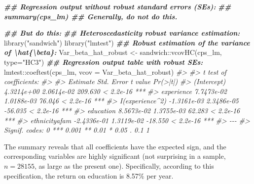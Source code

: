 \documentclass[
  14pt,
]{memoir}
\newenvironment{Shaded}{\begin{snugshade}}{\end{snugshade}}
\newcommand{\AttributeTok}[1]{\textcolor[rgb]{0.77,0.63,0.00}{#1}}
\newcommand{\CommentTok}[1]{\textcolor[rgb]{0.56,0.35,0.01}{\textit{#1}}}
\newcommand{\DocumentationTok}[1]{\textcolor[rgb]{0.56,0.35,0.01}{\textbf{\textit{#1}}}}
\newcommand{\FunctionTok}[1]{\textcolor[rgb]{0.00,0.00,0.00}{#1}}
\newcommand{\NormalTok}[1]{#1}
\newcommand{\OtherTok}[1]{\textcolor[rgb]{0.56,0.35,0.01}{#1}}
\newcommand{\SpecialCharTok}[1]{\textcolor[rgb]{0.00,0.00,0.00}{#1}}
\newcommand{\StringTok}[1]{\textcolor[rgb]{0.31,0.60,0.02}{#1}}
\begin{document}
\begin{Shaded}
\begin{Highlighting}[]
\DocumentationTok{\#\# Regression output without robust standard errors (SEs):}
\DocumentationTok{\#\# summary(cps\_lm) \#\# Generally, do not do this.}

\DocumentationTok{\#\# But do this: }
\DocumentationTok{\#\# Heteroscedasticity robust variance estimation: }
\FunctionTok{library}\NormalTok{(}\StringTok{"sandwich"}\NormalTok{) }
\FunctionTok{library}\NormalTok{(}\StringTok{"lmtest"}\NormalTok{)}
\DocumentationTok{\#\# Robust estimation of the variance of \textbackslash{}hat\{\textbackslash{}beta\}:}
\NormalTok{Var\_beta\_hat\_robust }\OtherTok{\textless{}{-}}\NormalTok{ sandwich}\SpecialCharTok{::}\FunctionTok{vcovHC}\NormalTok{(cps\_lm, }\AttributeTok{type=}\StringTok{"HC3"}\NormalTok{)}
\DocumentationTok{\#\# Regression output table with robust SEs:}
\NormalTok{lmtest}\SpecialCharTok{::}\FunctionTok{coeftest}\NormalTok{(cps\_lm, }\AttributeTok{vcov =}\NormalTok{ Var\_beta\_hat\_robust)}
\CommentTok{\#\textgreater{} }
\CommentTok{\#\textgreater{} t test of coefficients:}
\CommentTok{\#\textgreater{} }
\CommentTok{\#\textgreater{}                    Estimate  Std. Error t value  Pr(\textgreater{}|t|)    }
\CommentTok{\#\textgreater{} (Intercept)      4.3214e+00  2.0614e{-}02 209.630 \textless{} 2.2e{-}16 ***}
\CommentTok{\#\textgreater{} experience       7.7473e{-}02  1.0188e{-}03  76.046 \textless{} 2.2e{-}16 ***}
\CommentTok{\#\textgreater{} I(experience\^{}2) {-}1.3161e{-}03  2.3486e{-}05 {-}56.035 \textless{} 2.2e{-}16 ***}
\CommentTok{\#\textgreater{} education        8.5673e{-}02  1.3755e{-}03  62.283 \textless{} 2.2e{-}16 ***}
\CommentTok{\#\textgreater{} ethnicityafam   {-}2.4336e{-}01  1.3119e{-}02 {-}18.550 \textless{} 2.2e{-}16 ***}
\CommentTok{\#\textgreater{} {-}{-}{-}}
\CommentTok{\#\textgreater{} Signif. codes:  0 \textquotesingle{}***\textquotesingle{} 0.001 \textquotesingle{}**\textquotesingle{} 0.01 \textquotesingle{}*\textquotesingle{} 0.05 \textquotesingle{}.\textquotesingle{} 0.1 \textquotesingle{} \textquotesingle{} 1}
\end{Highlighting}
\end{Shaded}

The summary reveals that all coefficients have the expected sign, and the corresponding variables
are highly significant (not surprising in a sample, \(n=28155\), as large as the present one).
Specifically, according to this specification, the return on education is 8.57\% per year.
\end{document}
